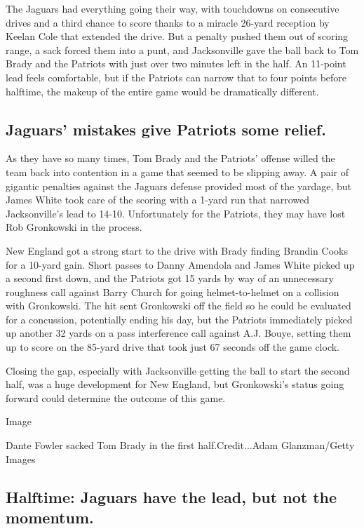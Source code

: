 The Jaguars had everything going their way, with touchdowns on
consecutive drives and a third chance to score thanks to a miracle
26-yard reception by Keelan Cole that extended the drive. But a penalty
pushed them out of scoring range, a sack forced them into a punt, and
Jacksonville gave the ball back to Tom Brady and the Patriots with just
over two minutes left in the half. An 11-point lead feels comfortable,
but if the Patriots can narrow that to four points before halftime, the
makeup of the entire game would be dramatically different.

\hypertarget{jaguars-mistakes-give-patriots-some-relief}{%
\subsection{Jaguars' mistakes give Patriots some
relief.}\label{jaguars-mistakes-give-patriots-some-relief}}

As they have so many times, Tom Brady and the Patriots' offense willed
the team back into contention in a game that seemed to be slipping away.
A pair of gigantic penalties against the Jaguars defense provided most
of the yardage, but James White took care of the scoring with a 1-yard
run that narrowed Jacksonville's lead to 14-10. Unfortunately for the
Patriots, they may have lost Rob Gronkowski in the process.

New England got a strong start to the drive with Brady finding Brandin
Cooks for a 10-yard gain. Short passes to Danny Amendola and James White
picked up a second first down, and the Patriots got 15 yards by way of
an unnecessary roughness call against Barry Church for going
helmet-to-helmet on a collision with Gronkowski. The hit sent Gronkowski
off the field so he could be evaluated for a concussion, potentially
ending his day, but the Patriots immediately picked up another 32 yards
on a pass interference call against A.J. Bouye, setting them up to score
on the 85-yard drive that took just 67 seconds off the game clock.

Closing the gap, especially with Jacksonville getting the ball to start
the second half, was a huge development for New England, but
Gronkowski's status going forward could determine the outcome of this
game.

Image

Dante Fowler sacked Tom Brady in the first half.Credit...Adam
Glanzman/Getty Images

\hypertarget{halftime-jaguars-have-the-lead-but-not-the-momentum}{%
\subsection{Halftime: Jaguars have the lead, but not the
momentum.}\label{halftime-jaguars-have-the-lead-but-not-the-momentum}}

